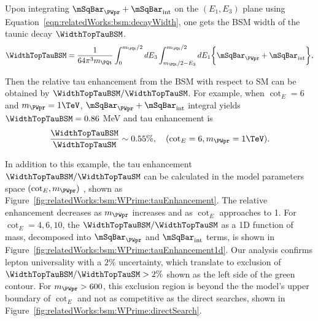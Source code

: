 Upon integrating  $\mSqBar _{\PWpr} +  \mSqBar _{\mathrm{int}}$ on the $(E_1,E_3)$ plane using Equation~\ref{eqn:relatedWorks:bsm:decayWidth}, one gets the BSM width of the taunic decay $\WidthTopTauBSM$. 
\begin{equation}
	\WidthTopTauBSM = \frac{1}{64 \pi^3 m_\PQt} \int_{0}^{m_\PQt/2} dE_3 \int_{m_\PQt/2-E_3}^{m_\PQt/2} dE_1  \bigg\{ \mSqBar _{\PWpr} +  \mSqBar_{\mathrm{int}}  \bigg \},
\end{equation}


\noindent Then the relative tau enhancement from the BSM with respect to SM can be obtained by $\WidthTopTauBSM/ \WidthTopTauSM$. For example, when $\cot_E=6$  and $m_{\PWpr}=1\TeV$, $\mSqBar _{\PWpr} +  \mSqBar _{\mathrm{int}}$ integral yields $\WidthTopTauBSM = 0.86 $ MeV and tau enhancement is
\begin{equation}
	\frac{ \WidthTopTauBSM}{ \WidthTopTauSM} \sim 0.55 \%, \quad (\cot_E=6, m_{\PWpr}=1 \text{\TeV}).
\end{equation}

\noindent In addition to this example, the tau enhancement $\WidthTopTauBSM/  \WidthTopTauSM $ can be calculated in the model parameters space $(\cot_E, m_{\PWpr})$ , shown as Figure~\ref{fig:relatedWorks:bsm:WPrime:tauEnhancement}. The relative enhancement decreases as $m_{\PWpr}$ increases and as $\cot_E$ approaches to 1. For $\cot_E=4,6,10$, the $\WidthTopTauBSM/  \WidthTopTauSM $ as a 1D function of \PWpr mass, decomposed into $\mSqBar _{\PWpr} $ and $\mSqBar _{\mathrm{int}}$  terms, is shown in Figure~\ref{fig:relatedWorks:bsm:WPrime:tauEnhancement1d}. Our analysis confirms lepton universality with a $2\%$ uncertainty, which translate to exclusion of $ \WidthTopTauBSM/  \WidthTopTauSM  >  2\%$ shown as the left side of the green contour. For $m_{\PWpr}>600$\GeV, this exclusion region is beyond the the model's upper boundary of $\cot_E$ and not as competitive as the direct searches, shown in Figure~\ref{fig:relatedWorks:bsm:WPrime:directSearch}.




